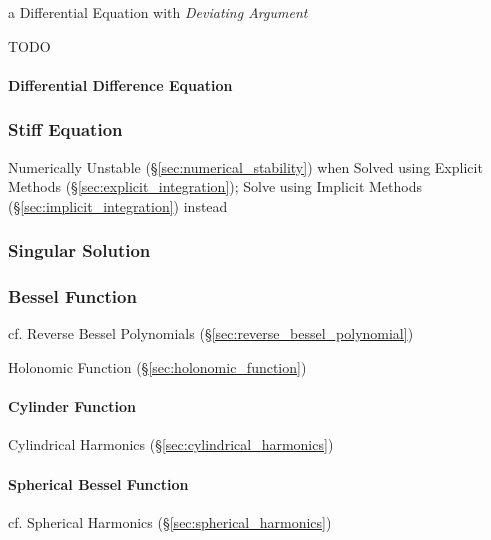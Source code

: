 a Differential Equation with \emph{Deviating Argument}

TODO



\paragraph{Differential Difference Equation}\label{sec:dde}\hfill



\subsubsection{Stiff Equation}\label{sec:stiff_equation}

Numerically Unstable (\S\ref{sec:numerical_stability}) when Solved using
Explicit Methods (\S\ref{sec:explicit_integration});
Solve using Implicit Methods (\S\ref{sec:implicit_integration}) instead



\subsubsection{Singular Solution}\label{sec:singular_solution}

\subsubsection{Bessel Function}\label{sec:bessel_function}

cf. Reverse Bessel Polynomials (\S\ref{sec:reverse_bessel_polynomial})

\fist Holonomic Function (\S\ref{sec:holonomic_function})



\paragraph{Cylinder Function}\label{sec:cylinder_function}\hfill

\fist Cylindrical Harmonics (\S\ref{sec:cylindrical_harmonics})



\paragraph{Spherical Bessel Function}\label{sec:spherical_bessel}\hfill

\fist cf. Spherical Harmonics (\S\ref{sec:spherical_harmonics})



